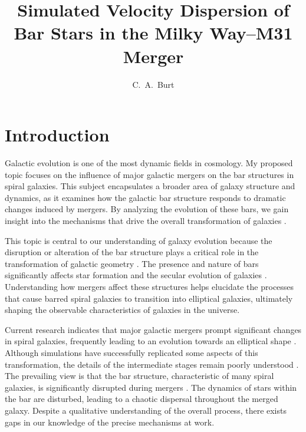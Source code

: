 \documentclass[twocolumn]{aastex631}
\begin{document}
\title{Simulated Velocity Dispersion of Bar Stars in the Milky Way–M31 Merger}

\author[0009-0008-2061-4946]{C.~A.~Burt}




\section{Introduction}

Galactic evolution is one of the most dynamic fields in cosmology. My
proposed topic focuses on the influence of major galactic mergers on
the bar structures in spiral galaxies. This subject encapsulates a
broader area of galaxy structure and dynamics, as it examines how the
galactic bar structure responds to dramatic changes induced by
mergers. By analyzing the evolution of these bars, we gain insight
into the mechanisms that drive the overall transformation of galaxies
\citep[e.g.,][]{vandermarel:01}.

This topic is central to our understanding of galaxy evolution because
the disruption or alteration of the bar structure plays a critical
role in the transformation of galactic geometry \citep{wu:18}. The presence
and nature of bars significantly affects star formation and the
secular evolution of galaxies \citep{schoenrich:17}. Understanding how mergers affect
these structures helps elucidate the processes that cause barred spiral
galaxies to transition into elliptical galaxies, ultimately shaping the
observable characteristics of galaxies in the universe.

Current research indicates that major galactic mergers prompt
significant changes in spiral galaxies, frequently leading to an
evolution towards an elliptical shape
\citep[e.g.,][]{mutch:11}. Although simulations have successfully
replicated some aspects of this transformation, the details of the
intermediate stages remain poorly understood \citep{berentzen:03}. The
prevailing view is that the bar structure, characteristic of many
spiral galaxies, is significantly disrupted during mergers
\citep[e.g.,][]{mutch:11}. The dynamics of stars within the bar are
disturbed, leading to a chaotic dispersal throughout the merged
galaxy. Despite a qualitative understanding of the overall process,
there exists gaps in our knowledge of the precise mechanisms at work.
\end{document}
